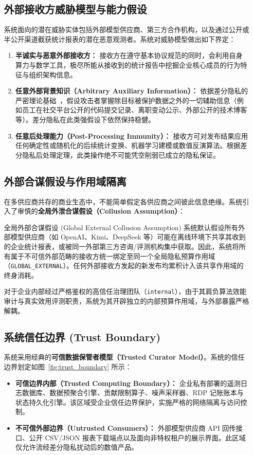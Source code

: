 \subsection{外部接收方威胁模型与能力假设}
系统面向的潜在威胁实体包括外部模型供应商、第三方合作机构，以及通过公开或半公开渠道截获统计报表的潜在恶意观测者。系统对威胁模型做出如下界定：
\begin{enumerate}[label=(\alph*), leftmargin=2.5em]
  \item \textbf{半诚实与恶意外部接收方：} 接收方在遵守基本协议规范的同时，会利用自身算力与数学工具，极尽所能从接收到的统计报告中挖掘企业核心成员的行为特征与组织架构信息。
  \item \textbf{任意外部背景知识（Arbitrary Auxiliary Information）：} 依据差分隐私的严密理论基础~\cite{dwork2006calibrating}，假设攻击者掌握除目标被保护数据之外的一切辅助信息（例如员工在社交平台公开的代码提交记录、离职变动公示、外部公开的技术博客等）。差分隐私在此类强假设下依然保持稳健。
  \item \textbf{任意后处理能力（Post-Processing Immunity）：} 接收方可对发布结果应用任何确定性或随机化的后续统计变换、机器学习建模或数值反演算法。根据差分隐私后处理定理，此类操作绝不可能凭空削弱已成立的隐私保证。
\end{enumerate}

\subsection{外部合谋假设与作用域隔离}
在多供应商共存的商业生态中，不能简单假定各供应商之间彼此信息绝缘。系统引入了审慎的\textbf{全局外泄合谋假设（Collusion Assumption）}：
\begin{techbox}{全局外部合谋假设 (Global External Collusion Assumption)}
系统默认假设所有外部模型供应商（如 OpenAI、Kimi、DeepSeek 等）可能在离线环境下共享其收到的企业统计报表，或被同一外部第三方咨询/评测机构集中获取。因此，系统将所有属于不可信外部范畴的接收方统一绑定至同一个全局隐私预算作用域（\texttt{GLOBAL\_EXTERNAL}）。任何外部接收方发起的新发布均累积计入该共享作用域的终身消耗。
\end{techbox}

对于企业内部经过严格鉴权的高信任治理团队（\texttt{internal}），由于其肩负算法效能审计与真实效用评测职责，系统为其开辟独立的内部预算作用域，与外部暴露严格解耦。

\subsection{系统信任边界 (Trust Boundary)}
系统采用经典的\textbf{可信数据保管者模型（Trusted Curator Model）}。系统的信任边界划定如图~\ref{fig:trust_boundary} 所示：
\begin{itemize}[leftmargin=2em]
  \item \textbf{可信边界内部（Trusted Computing Boundary）：} 企业私有部署的遥测日志数据库、数据预聚合引擎、贡献限制算子、噪声采样器、RDP 记账账本与状态持久化引擎。该区域受企业信任边界保护，实施严格的网络隔离与访问控制。
  \item \textbf{不可信外部边界（Untrusted Consumers）：} 外部模型供应商 API 回传接口、公开 CSV/JSON 报表下载端点以及面向非特权租户的展示界面。此区域仅允许流经差分隐私扰动后的数值产品。
\end{itemize}

